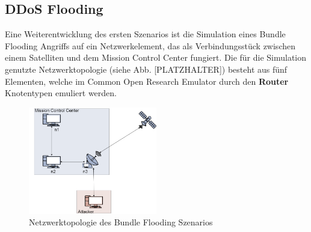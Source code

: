 \documentclass{article}
\begin{document}
\subsection{DDoS Flooding}
Eine Weiterentwicklung des ersten Szenarios ist die Simulation eines Bundle Flooding Angriffs auf ein Netzwerkelement, das als Verbindungsstück zwischen einem Satelliten und dem Mission Control Center fungiert. Die für die Simulation genutzte Netzwerktopologie (siehe Abb. [PLATZHALTER]) besteht aus fünf Elementen, welche im Common Open Research Emulator durch den \textbf{Router} Knotentypen emuliert werden.\par
\begin{figure}[h]
\centering
\includegraphics[width=0.5\textwidth]{flooding}
\caption{Netzwerktopologie des Bundle Flooding Szenarios}
\end{figure}
\end{document}
